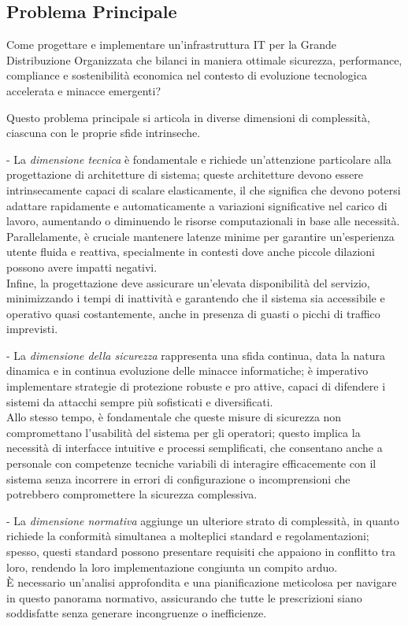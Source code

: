 \documentclass[12pt,a4paper,oneside]{book}
\numberwithin{figure}{chapter} %
\numberwithin{table}{chapter}  %
\begin{document}
\subsection{\texorpdfstring{\textbf{Problema Principale}}{1.2.1 Problema Principale}}\label{problema-principale}

Come progettare e implementare un'infrastruttura IT per la Grande
Distribuzione Organizzata che bilanci in maniera ottimale sicurezza,
performance, compliance e sostenibilità economica nel contesto di
evoluzione tecnologica accelerata e minacce emergenti?

Questo problema principale si articola in diverse dimensioni di
complessità, ciascuna con le proprie sfide intrinseche.

- La \emph{dimensione tecnica} è fondamentale e richiede un'attenzione
particolare alla progettazione di architetture di sistema; queste
architetture devono essere intrinsecamente capaci di scalare
elasticamente, il che significa che devono potersi adattare rapidamente
e automaticamente a variazioni significative nel carico di lavoro,
aumentando o diminuendo le risorse computazionali in base alle
necessità.\\
Parallelamente, è cruciale mantenere latenze minime per garantire
un'esperienza utente fluida e reattiva, specialmente in contesti dove
anche piccole dilazioni possono avere impatti negativi.\\
Infine, la progettazione deve assicurare un'elevata disponibilità del
servizio, minimizzando i tempi di inattività e garantendo che il sistema
sia accessibile e operativo quasi costantemente, anche in presenza di
guasti o picchi di traffico imprevisti.

- La \emph{dimensione della sicurezza} rappresenta una sfida continua,
data la natura dinamica e in continua evoluzione delle minacce
informatiche; è imperativo implementare strategie di protezione robuste
e pro attive, capaci di difendere i sistemi da attacchi sempre più
sofisticati e diversificati.\\
Allo stesso tempo, è fondamentale che queste misure di sicurezza non
compromettano l'usabilità del sistema per gli operatori; questo implica
la necessità di interfacce intuitive e processi semplificati, che
consentano anche a personale con competenze tecniche variabili di
interagire efficacemente con il sistema senza incorrere in errori di
configurazione o incomprensioni che potrebbero compromettere la
sicurezza complessiva.

- La \emph{dimensione normativa} aggiunge un ulteriore strato di
complessità, in quanto richiede la conformità simultanea a molteplici
standard e regolamentazioni; spesso, questi standard possono presentare
requisiti che appaiono in conflitto tra loro, rendendo la loro
implementazione congiunta un compito arduo.\\
È necessario un'analisi approfondita e una pianificazione meticolosa per
navigare in questo panorama normativo, assicurando che tutte le
prescrizioni siano soddisfatte senza generare incongruenze o
inefficienze.
\end{document}

